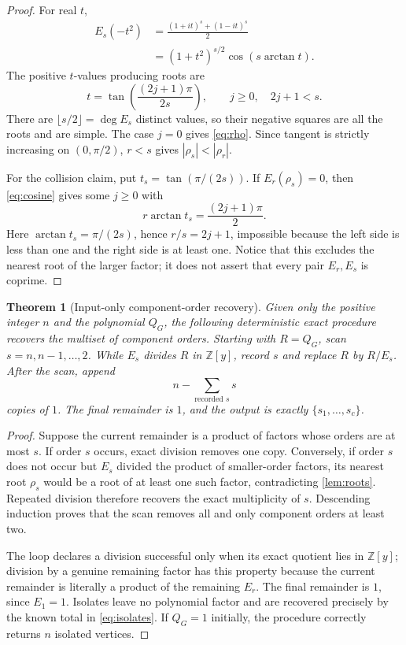 \documentclass[10pt,a4paper]{amsart}
\newtheorem{theorem}{Theorem}[section]
\theoremstyle{remark}
\begin{document}
\begin{proof}
For real $t$,
\begin{align}\label{eq:cosine}
 E_s(-t^2)
 &=\frac{(1+it)^s+(1-it)^s}{2} \\
 &=(1+t^2)^{s/2}\cos(s\arctan t).
\end{align}
The positive $t$-values producing roots are
\begin{equation}\label{eq:root-list}
 t=\tan\!\left(\frac{(2j+1)\pi}{2s}\right),
 \qquad j\geq0,\quad 2j+1<s.
\end{equation}
There are $\lfloor s/2\rfloor=\deg E_s$ distinct values, so their negative
squares are all the roots and are simple.  The case $j=0$ gives
\eqref{eq:rho}.  Since tangent is strictly increasing on $(0,\pi/2)$,
$r<s$ gives $|\rho_s|<|\rho_r|$.

For the collision claim, put $t_s=\tan(\pi/(2s))$.  If
$E_r(\rho_s)=0$, then \eqref{eq:cosine} gives some $j\geq0$ with
\[
 r\arctan t_s=\frac{(2j+1)\pi}{2}.
\]
Here $\arctan t_s=\pi/(2s)$, hence $r/s=2j+1$, impossible because the left
side is less than one and the right side is at least one.  Notice that this
excludes the nearest root of the larger factor; it does not assert that every
pair $E_r,E_s$ is coprime.
\end{proof}

\begin{theorem}[Input-only component-order recovery]\label{thm:inverse}
Given only the positive integer $n$ and the polynomial $Q_G$, the following
deterministic exact procedure recovers the multiset of component orders.
Starting with $R=Q_G$, scan $s=n,n-1,\ldots,2$.  While $E_s$ divides $R$ in
$\mathbb Z[y]$, record $s$ and replace $R$ by $R/E_s$.  After the scan, append
\begin{equation}\label{eq:isolates}
                 n-\sum_{\text{recorded }s}s
\end{equation}
copies of $1$.  The final remainder is $1$, and the output is exactly
$\{s_1,\ldots,s_c\}$.
\end{theorem}

\begin{proof}
Suppose the current remainder is a product of factors whose orders are at
most $s$.  If order $s$ occurs, exact division removes one copy.  Conversely,
if order $s$ does not occur but $E_s$ divided the product of smaller-order
factors, its nearest root $\rho_s$ would be a root of at least one such factor,
contradicting \cref{lem:roots}.  Repeated division therefore recovers the
exact multiplicity of $s$.  Descending induction proves that the scan removes
all and only component orders at least two.

The loop declares a division successful only when its exact quotient lies in
$\mathbb Z[y]$; division by a genuine remaining factor has this property
because the current remainder is literally a product of the remaining
$E_r$.  The final remainder is $1$, since
$E_1=1$.  Isolates leave no polynomial factor and are recovered precisely by
the known total in \eqref{eq:isolates}.  If $Q_G=1$ initially, the procedure
correctly returns $n$ isolated vertices.
\end{proof}
\end{document}
